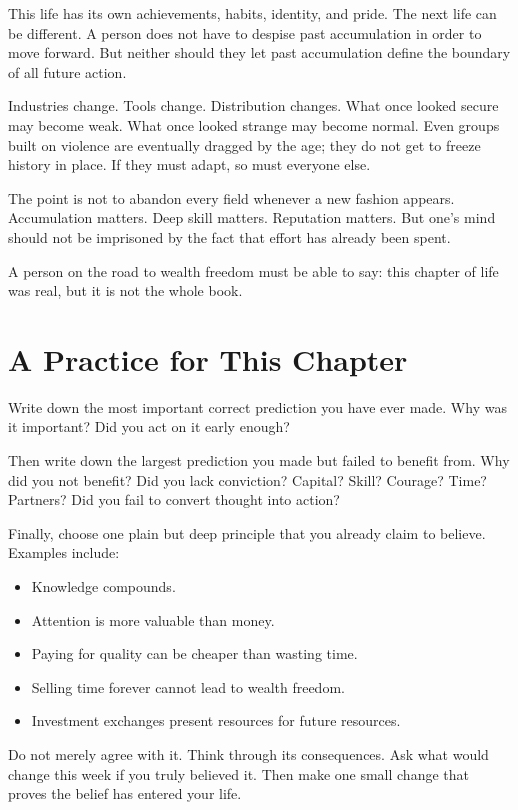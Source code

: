 This life has its own achievements, habits, identity, and pride. The next life can be different. A person does not have to despise past accumulation in order to move forward. But neither should they let past accumulation define the boundary of all future action.

Industries change. Tools change. Distribution changes. What once looked secure may become weak. What once looked strange may become normal. Even groups built on violence are eventually dragged by the age; they do not get to freeze history in place. If they must adapt, so must everyone else.

The point is not to abandon every field whenever a new fashion appears. Accumulation matters. Deep skill matters. Reputation matters. But one's mind should not be imprisoned by the fact that effort has already been spent.

A person on the road to wealth freedom must be able to say: this chapter of life was real, but it is not the whole book.

\section*{A Practice for This Chapter}

Write down the most important correct prediction you have ever made. Why was it important? Did you act on it early enough?

Then write down the largest prediction you made but failed to benefit from. Why did you not benefit? Did you lack conviction? Capital? Skill? Courage? Time? Partners? Did you fail to convert thought into action?

Finally, choose one plain but deep principle that you already claim to believe. Examples include:

\begin{itemize}
\item Knowledge compounds.
\item Attention is more valuable than money.
\item Paying for quality can be cheaper than wasting time.
\item Selling time forever cannot lead to wealth freedom.
\item Investment exchanges present resources for future resources.
\end{itemize}

Do not merely agree with it. Think through its consequences. Ask what would change this week if you truly believed it. Then make one small change that proves the belief has entered your life.

